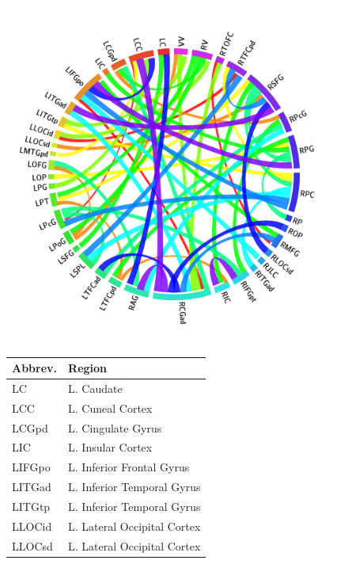 \documentclass{llncs}
\begin{document}
\begin{figure}[htb]
\begin{minipage}[b]{.6\linewidth} 
\centering
	\includegraphics[scale = .11]{now_circos3.png}
	\par\vspace{0pt}
\end{minipage}
\begin{minipage}[b]{.4\linewidth}
\centering
\tiny
\begin{tabular}{l l}
\hline
Abbrev. & Region\\
\hline
LC	& L. Caudate\\
LCC	& L. Cuneal Cortex\\
LCGpd	& L. Cingulate Gyrus\\
LIC	& L. Insular Cortex\\
LIFGpo	& L. Inferior Frontal Gyrus\\
LITGad	& L. Inferior Temporal Gyrus\\
LITGtp	& L. Inferior Temporal Gyrus\\
LLOCid	& L. Lateral Occipital Cortex\\
LLOCsd	& L. Lateral Occipital Cortex\\

\end{tabular}
\end{minipage}
\end{figure}
\end{document}
